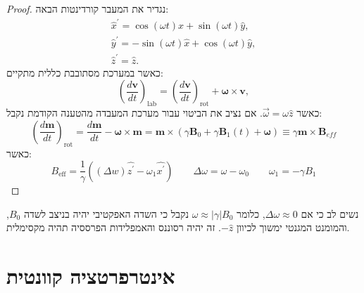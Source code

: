 \documentclass{tstextbook}
\begin{document}
\begin{proof}
נגדיר את המעבר קורדינטות הבאה:
$$\begin{array}{c}{{\hat{x}^{\prime}=\cos(\omega t)\hat{x}+\sin(\omega t)\hat{y},}}\\ {{\hat{y}^{\prime}=-\sin(\omega t)\hat{x}+\cos(\omega t)\hat{y},}}\\ {{\hat{z}^{\prime}=\hat{z}.}}\end{array}$$
כאשר במערכת מסתובבת כללית מתקיים:
$$\left({\frac{d\mathbf{v}}{d t}}\right)_{\mathrm{lab}}=\left({\frac{d\mathbf{v}}{d t}}\right)_{\mathrm{rot}}+{\boldsymbol{\omega}}\times\mathbf{v},$$
כאשר \(\vec{\omega}=\omega \hat{z}\). אם נציב את הביטוי עבור מערכת המעבדה מהטענה הקודמת נקבל:
$$\left(\frac{d\mathbf{m}}{d t}\right)_{\text{rot}}=\frac{d\mathbf{m}}{d t}-\mathbf{\omega}\times\mathbf{m}=\mathbf{m}\times\left( \gamma\mathbf{B}_{0}+\gamma\mathbf{B}_{1}(t)+\mathbf{\omega} \right)\equiv\gamma\mathbf{m}\times\mathbf{B}_{e f f}$$
כאשר:
$$B_{\text{eff}}=\frac{1}{\gamma}\left(\left( \Delta w \right)\hat{z^{\prime}}-\omega_{1}\hat{x^{\prime}}\right) \qquad  \Delta \omega= \omega-\omega_{0}\qquad \omega_{1}=-\gamma B_{1}$$

\end{proof}
\begin{definition}
\end{definition}
\begin{remark}
נשים לב כי אם \(\Delta \omega \approx 0\), כלומר \(\omega \approx |\gamma|B_{0}\) נקבל כי השדה האפקטיבי יהיה בניצב לשדה \(B_{0}\), והמומנט המגנטי ימשוך לכיוון \(-\hat{z}\). זה יהיה רסוננס והאמפלידות הפרססיה תהיה מקסימלית.

\end{remark}
\section{אינטרפרטציה קוונטית}
\end{document}
